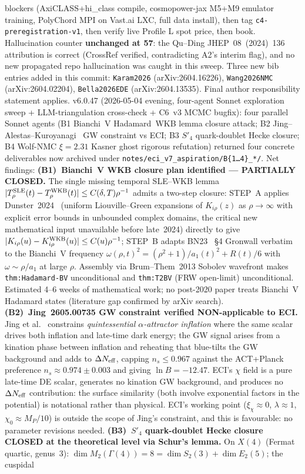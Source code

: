 \documentclass[reprint,amsmath,amssymb,aps,prd,superscriptaddress]{revtex4-2}
\providecommand{\1}{\mathbf{1}}
\begin{document}
blockers (AxiCLASS+hi\_class compile, cosmopower-jax M5+M9 emulator training, PolyChord MPI on Vast.ai LXC, full data install), then tag \texttt{c4-preregistration-v1}, then verify live Profile L spot price, then book. Hallucination counter \textbf{unchanged at 57}: the Qu--Ding JHEP~08~(2024)~136 attribution is correct (CrossRef verified, contradicting A2's interim flag), and no new propagated repo hallucination was caught in this sweep. Three new bib entries added in this commit: \texttt{Karam2026} (arXiv:2604.16226), \texttt{Wang2026NMC} (arXiv:2604.02204), \texttt{Bella2026EDE} (arXiv:2604.13535). Final author responsibility statement applies. v6.0.47 (2026-05-04 evening, four-agent Sonnet exploration sweep + LLM-triangulation cross-check + C6~v3 MCMC bugfix): four parallel Sonnet agents (B1 Bianchi~V Hadamard~WKB lemma closure attack; B2 Jing--Alestas--Kuroyanagi~\cite{JingAlestasKuroyanagi2026} GW constraint vs ECI; B3 $S'_4$ quark-doublet Hecke closure; B4 Wolf-NMC $\xi=2.31$ Kasner ghost rigorous refutation) returned four concrete deliverables now archived under \texttt{notes/eci\_v7\_aspiration/B\{1\ldots4\}\_*/}. Net findings: \textbf{(B1)~Bianchi~V WKB closure plan identified --- PARTIALLY CLOSED.} The single missing temporal SLE--WKB lemma $|T^{\rm SLE}_\rho(t) - T^{\rm WKB}_\rho(t)| \le C(\delta,T)\rho^{-1}$ admits a two-step closure: STEP~A applies Dunster~2024~\cite{Dunster2024Bessel} (uniform Liouville--Green expansions of $K_{i\rho}(z)$ as $\rho\to\infty$ with explicit error bounds in unbounded complex domains, the critical new mathematical input unavailable before late~2024) directly to give $|K_{i\rho}(u) - K^{\rm WKB}_{i\rho}(u)| \le C(u)\rho^{-1}$; STEP~B adapts BN23~\cite{BuntingNicolini2023} \S4 Gronwall verbatim to the Bianchi~V frequency $\omega(\rho,t)^2 = (\rho^2+1)/a_1(t)^2 + R(t)/6$ with $\omega \sim \rho/a_1$ at large $\rho$. Assembly via Brum--Them~2013 Sobolev wavefront makes \texttt{thm:Hadamard-BV} unconditional and \texttt{thm:T2BV} (FRW open-limit) unconditional. Estimated 4--6 weeks of mathematical work; no post-2020 paper treats Bianchi~V Hadamard states (literature gap confirmed by arXiv search). \textbf{(B2)~Jing~2605.00735 GW constraint verified NON-applicable to ECI.} Jing et al.~\cite{JingAlestasKuroyanagi2026} constrains \emph{quintessential $\alpha$-attractor inflation} where the same scalar drives both inflation and late-time dark energy; the GW signal arises from a kination phase between inflation and reheating that blue-tilts the GW background and adds to $\Delta N_{\rm eff}$, capping $n_s \le 0.967$ against the ACT+Planck preference $n_s \approx 0.974\pm0.003$ and giving $\ln B = -12.47$. ECI's $\chi$ field is a pure late-time DE scalar, generates no kination GW background, and produces no $\Delta N_{\rm eff}$ contribution: the surface similarity (both involve exponential factors in the potential) is notational rather than physical. ECI's working point ($\xi_\chi \approx 0$, $\lambda \approx 1$, $\chi_0 \approx M_P/10$) is outside the scope of Jing's constraint, and this is favourable: no parameter revisions needed. \textbf{(B3)~$S'_4$ quark-doublet Hecke closure CLOSED at the theoretical level via Schur's lemma.} On $X(4)$ (Fermat quartic, genus~3): $\dim M_2(\Gamma(4)) = 8 = \dim S_2(3) + \dim E_2(5)$; the cuspidal 
\end{document}
